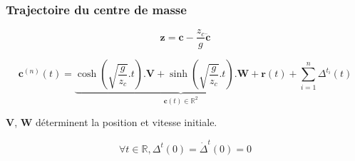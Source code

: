 \documentclass[14pt,utf8,hyperref={pdfpagelabels=false}]{beamer}
\begin{document}
\begin{slideAction}
  \frametitle{Trajectoire du centre de masse}


  \begin{equation*}
    \mathbf{z} = \mathbf{c} - \frac{z_c}{g} \ddot{\mathbf{c}}
  \end{equation*}

  \begin{equation*}
    \mathbf{c}^{(n)}(t) =
    \underbrace{\scriptstyle \cosh(\sqrt{\frac{g}{z_c}}.t) . \mathbf{V} +
      \sinh(\sqrt{\frac{g}{z_c}}.t) . \mathbf{W} +
      \mathbf{r}(t)}_{\mathbf{c}(t) \in \mathbb{R}^2} + \sum_{i=1}^n \Delta^{t_i}(t)
  \end{equation*}

  \begin{center}
    $\mathbf{V}$, $\mathbf{W}$ déterminent la position et vitesse
    initiale.
  \end{center}

  \begin{equation*}
    \forall t \in \mathbb{R}, \Delta^t(0) = \dot{\Delta}^t(0) = 0
  \end{equation*}
\end{slideAction}


\begin{frame}[plain]
  \begin{changemargin}{-1cm}{-1cm}
    \begin{center}
      \vspace{-0.1cm}
    \end{center}
  \end{changemargin}
\end{frame}

\begin{frame}[plain]
  \begin{changemargin}{-1cm}{-1cm}
    \begin{center}
      \vspace{-0.1cm}
    \end{center}
  \end{changemargin}
\end{frame}
\end{document}
